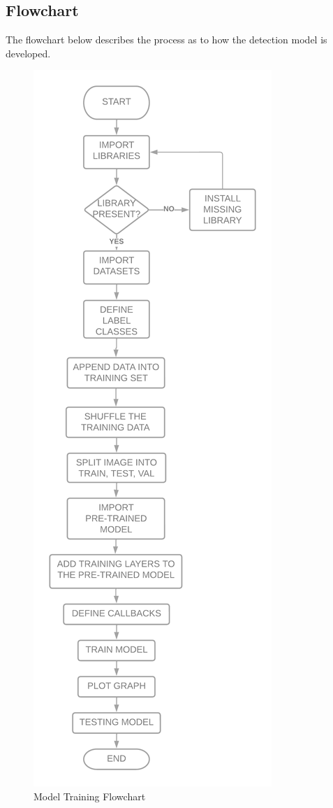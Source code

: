 \subsection{Flowchart}
The flowchart below describes the process as to how the detection model is developed.
\begin{figure}[H]
\includegraphics[scale=0.2]{Photos/phase2_model_flowchart.png}
\caption{Model Training Flowchart} \label{fig:Model Summary}
\end{figure}
